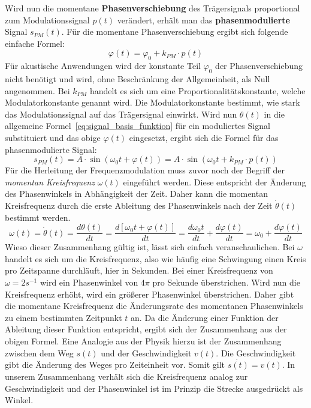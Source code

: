 Wird nun die momentane \textbf{Phasenverschiebung} des Trägersignals proportional zum Modulationssignal \(p(t)\) verändert, erhält man das \textbf{phasenmodulierte} Signal \(s_{PM}(t)\). \cite[S. 209]{lathi}
Für die momentane Phasenverschiebung ergibt sich folgende einfache Formel:
\begin{equation}
\varphi(t)=\varphi_0+k_{PM}\cdot p(t)
\label{eq:varphi_t}
\end{equation}
Für akustische Anwendungen wird der konstante Teil \(\varphi_0\) der Phasenverschiebung nicht benötigt und wird, ohne Beschränkung der Allgemeinheit, als Null angenommen.
Bei \(k_{PM}\) handelt es sich um eine Proportionalitätskonstante, welche Modulatorkonstante genannt wird. Die Modulatorkonstante bestimmt, wie stark das Modulationssignal auf das Trägersignal einwirkt. Wird nun \(\theta(t)\) in die allgemeine Formel~\ref{eq:signal_basis_funktion} für ein moduliertes Signal substituiert und das obige \(\varphi(t)\) eingesetzt, ergibt sich die Formel für das phasenmodulierte Signal:
\begin{equation}
s_{PM}(t)=A\cdot\sin(\omega_0t + \varphi(t))=A\cdot\sin(\omega_0t+k_{PM}\cdot p(t))
\label{eq:s_pm}
\end{equation}
Für die Herleitung der Frequenzmodulation muss zuvor noch der Begriff der \textit{momentan Kreisfrequenz} \(\omega(t)\) eingeführt werden.
Diese entspricht der Änderung des Phasenwinkels in Abhängigkeit der Zeit. Daher kann die momentan Kreisfrequenz durch die erste Ableitung des Phasenwinkels nach der Zeit $\dot \theta(t)$ bestimmt werden. \cite[S. 209]{lathi}
\begin{equation}
\omega(t)=\dot \theta(t)=\frac{d\theta(t)}{dt}=\frac{d[\omega_0t+\varphi(t)]}{dt}=\frac{d\omega_0t}{dt}+\frac{d\varphi(t)}{dt}=\omega_0+\frac{d\varphi(t)}{dt}
\label{eq:omega_m_herleitung}
\end{equation}
Wieso dieser Zusammenhang gültig ist, lässt sich einfach veranschaulichen. Bei \(\omega\) handelt es sich um die Kreisfrequenz, also wie häufig eine Schwingung einen Kreis pro Zeitspanne durchläuft, hier in Sekunden. Bei einer Kreisfrequenz von \(\omega=2 s^{-1}\) wird ein Phasenwinkel von \(4\pi\) pro Sekunde überstrichen. Wird nun die Kreisfrequenz erhöht, wird ein größerer Phasenwinkel überstrichen. Daher gibt die momentane Kreisfrequenz die Änderungsrate des momentanen Phasenwinkels zu einem bestimmten Zeitpunkt \(t\) an. Da die Änderung einer Funktion der Ableitung dieser Funktion entspricht, ergibt sich der Zusammenhang aus der obigen Formel. Eine Analogie aus der Physik hierzu ist der Zusammenhang zwischen dem Weg \(s(t)\) und der Geschwindigkeit \(v(t)\). Die Geschwindigkeit gibt die Änderung des Weges pro Zeiteinheit vor. Somit gilt \(\dot{s(t)}=v(t)\). In unserem Zusammenhang verhält sich die Kreisfrequenz analog zur Geschwindigkeit und der Phasenwinkel ist im Prinzip die Strecke ausgedrückt als Winkel.

